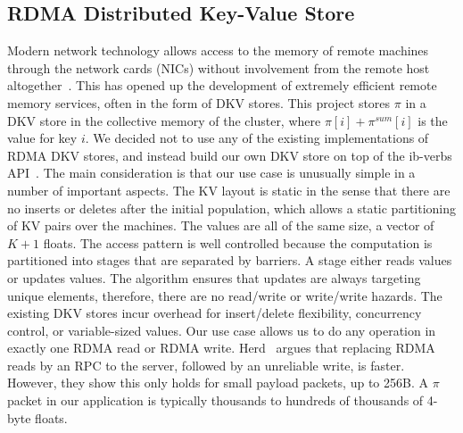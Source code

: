 \subsection{RDMA Distributed Key-Value Store}

Modern network technology allows access to the memory of remote machines
through the network cards (NICs) without involvement from the remote host
altogether~\cite{Hamada_infinibandtrade,Beck:2011:PER:2043535.2043537}.
This has opened up the development of
extremely efficient remote memory services, often in the form of DKV stores.
This project stores $\pi$ in a DKV store in the collective memory of the
cluster, where $\pi[i]+\pi^{sum}[i]$ is the value for key $i$. We decided not
to use any of the existing implementations of RDMA DKV stores, and instead
build our own DKV store on top of the ib-verbs API~\cite{ib-verbs}. The
main consideration is that our use case is unusually simple in a number
of important aspects. The KV layout is static in the sense that there are
no inserts or deletes after the initial population, which allows a static
partitioning of KV pairs over the machines. The values are all of the same size,
a vector of $K+1$ floats. The access pattern is well controlled because the
computation is partitioned into stages that are separated by barriers. A
stage either reads values or updates values. The algorithm ensures that updates
are always targeting unique elements,
therefore, there are no read/write or write/write hazards. The existing DKV stores incur
overhead for insert/delete flexibility, concurrency control, or variable-sized
values. Our use case allows us to do any operation in exactly one RDMA read
or RDMA write. Herd~\cite{Kalia:2014:URE:2740070.2626299} argues
that replacing RDMA reads by
an RPC to the server, followed by an unreliable write, is faster. However,
they show this only holds for small payload packets, up to 256B. A $\pi$
packet in our application is typically thousands to hundreds of thousands
of 4-byte floats.
